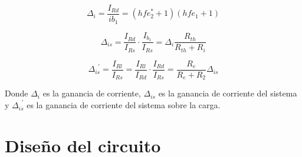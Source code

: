 	\begin{equation}	
		\Delta _{i}=\frac{I_{Rd}}{ib_{1}}=(hfe_{2}^{*}+1)(hfe_{1}+1)
		\label{mod_inc_ecs}
	\end{equation}

	\begin{equation}	
	\Delta_{is}=\frac{I_{Rd}}{I_{Rs}}\cdot\frac{I_{b_{1}}}{I_{Rs}}=\Delta_{i}\frac{R_{th}}{R_{th}+R_{i}}
	\label{mod_inc_ecs}
	\end{equation}

	\begin{equation}	
		\Delta_{is}^{\, \, \,'}=\frac{I_{Rl}}{I_{Rs}}=\frac{I_{Rl}}{I_{Rd}}\cdot\frac{I_{Rd}}{I_{Rs}}=\frac{R_{e}}{R_{e}+R_{2}}\Delta_{is}
		\label{mod_inc_ecs}
	\end{equation}

Donde $\Delta_{i}$ es la ganancia de corriente, $\Delta_{is}$ es la ganancia de corriente del sistema y $\Delta_{is}^{\, \, \,'}$ es la ganancia de corriente del sistema sobre la carga.
\section{Diseño del circuito}